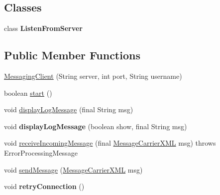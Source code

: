 \subsection*{Classes}
\begin{DoxyCompactItemize}
\item 
class {\bfseries Listen\-From\-Server}
\end{DoxyCompactItemize}
\subsection*{Public Member Functions}
\begin{DoxyCompactItemize}
\item 
\hyperlink{classgov_1_1fnal_1_1ppd_1_1dd_1_1chat_1_1MessagingClient_ae80bb10f995ac1e56519651d6e7bbc3a}{Messaging\-Client} (String server, int port, String username)
\item 
boolean \hyperlink{classgov_1_1fnal_1_1ppd_1_1dd_1_1chat_1_1MessagingClient_a68a15cf975653221f512387755cf392e}{start} ()
\item 
void \hyperlink{classgov_1_1fnal_1_1ppd_1_1dd_1_1chat_1_1MessagingClient_a13f893f839b69ca54b3ff1e7d8e890d7}{display\-Log\-Message} (final String msg)
\item 
\hypertarget{classgov_1_1fnal_1_1ppd_1_1dd_1_1chat_1_1MessagingClient_afa39b6278a4a60bf1b272e1a70317dfb}{void {\bfseries display\-Log\-Message} (boolean show, final String msg)}\label{classgov_1_1fnal_1_1ppd_1_1dd_1_1chat_1_1MessagingClient_afa39b6278a4a60bf1b272e1a70317dfb}

\item 
void \hyperlink{classgov_1_1fnal_1_1ppd_1_1dd_1_1chat_1_1MessagingClient_a0fea6f95402827dbbd88ebc22d357d8b}{receive\-Incoming\-Message} (final \hyperlink{classgov_1_1fnal_1_1ppd_1_1dd_1_1xml_1_1MessageCarrierXML}{Message\-Carrier\-X\-M\-L} msg)  throws Error\-Processing\-Message 
\item 
void \hyperlink{classgov_1_1fnal_1_1ppd_1_1dd_1_1chat_1_1MessagingClient_a40df82f525cdeda6046be90c2f80f095}{send\-Message} (\hyperlink{classgov_1_1fnal_1_1ppd_1_1dd_1_1xml_1_1MessageCarrierXML}{Message\-Carrier\-X\-M\-L} msg)
\item 
\hypertarget{classgov_1_1fnal_1_1ppd_1_1dd_1_1chat_1_1MessagingClient_a1db3a15685ceaa8514f041edb3dea297}{void {\bfseries retry\-Connection} ()}\label{classgov_1_1fnal_1_1ppd_1_1dd_1_1chat_1_1MessagingClient_a1db3a15685ceaa8514f041edb3dea297}


\end{DoxyCompactItemize}
